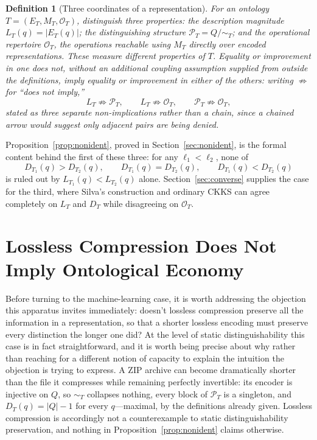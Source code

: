 \documentclass[11pt]{article}
\theoremstyle{plain}
\newtheorem{definition}{Definition}
\begin{document}
\begin{definition}[Three coordinates of a representation]
\label{def:threecoord}
For an ontology $T = (E_T, M_T, \mathcal{O}_T)$, distinguish three properties: the \emph{description magnitude} $L_T(q) = |E_T(q)|$; the \emph{distinguishing structure} $\mathcal{P}_T = Q/\!\sim_T$; and the \emph{operational repertoire} $\mathcal{O}_T$, the operations reachable using $M_T$ directly over encoded representations. These measure different properties of $T$. Equality or improvement in one does not, without an additional coupling assumption supplied from outside the definitions, imply equality or improvement in either of the others: writing $\not\Rightarrow$ for ``does not imply,''
\[
L_T \not\Rightarrow \mathcal{P}_T, \qquad L_T \not\Rightarrow \mathcal{O}_T, \qquad \mathcal{P}_T \not\Rightarrow \mathcal{O}_T,
\]
stated as three separate non-implications rather than a chain, since a chained arrow would suggest only adjacent pairs are being denied.
\end{definition}

Proposition~\ref{prop:nonident}, proved in Section~\ref{sec:nonident}, is the formal content behind the first of these three: for any $\ell_1 < \ell_2$, none of
\[
D_{T_1}(q) > D_{T_2}(q), \qquad D_{T_1}(q) = D_{T_2}(q), \qquad D_{T_1}(q) < D_{T_2}(q)
\]
is ruled out by $L_{T_1}(q) < L_{T_2}(q)$ alone. Section~\ref{sec:converse} supplies the case for the third, where Silva's construction and ordinary CKKS can agree completely on $L_T$ and $D_T$ while disagreeing on $\mathcal{O}_T$.

\section{Lossless Compression Does Not Imply Ontological Economy}
\label{sec:lossless}

Before turning to the machine-learning case, it is worth addressing the objection this apparatus invites immediately: doesn't lossless compression preserve all the information in a representation, so that a shorter lossless encoding must preserve every distinction the longer one did? At the level of static distinguishability this case is in fact straightforward, and it is worth being precise about why rather than reaching for a different notion of capacity to explain the intuition the objection is trying to express. A ZIP archive can become dramatically shorter than the file it compresses while remaining perfectly invertible: its encoder is injective on $Q$, so $\sim_T$ collapses nothing, every block of $\mathcal{P}_T$ is a singleton, and $D_T(q) = |Q|-1$ for every $q$---maximal, by the definitions already given. Lossless compression is accordingly not a counterexample to static distinguishability preservation, and nothing in Proposition~\ref{prop:nonident} claims otherwise.
\end{document}
